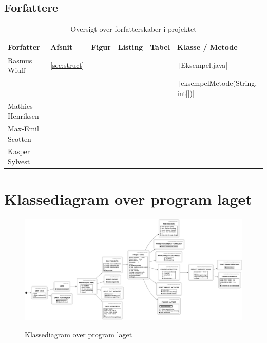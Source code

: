 \appendix
\appendixpage
\addappheadtotoc
\begin{landscape}
    \section{Forfattere}\label{apdx:forfattere}
    \begin{table}[H]
        \centering
        \caption{Oversigt over forfatterskaber i projektet}\label{tbl:forfatter}
        \begin{tabular}{llllll}
            \toprule
            Forfatter         & Afsnit            & Figur & Listing & Tabel & Klasse / Metode                                  \\
            \midrule
            Rasmus Wiuff      & \cref{sec:struct} &       &         &       & \texttt|Eksempel.java|                 \\
                              &                   &       &         &       & \texttt|eksempelMetode(String, int[])| \\
            \midrule
            Mathies Henriksen &                   &       &         &       &                                                  \\
            \midrule
            Max-Emil Scotten  &                   &       &         &       &                                                  \\
            \midrule
            Kasper Sylvest    &                   &       &         &       &                                                  \\
            \bottomrule
        \end{tabular}
    \end{table}
\end{landscape}

\section{Klassediagram over program laget}\label{apdx:classDiagram_full}
\begin{figure}[H]
    \centering
    \caption{Klassediagram over program laget}
    \includegraphics[width = \textwidth, keepaspectratio]{TaskFusion/out/assets/diagrams/flow_cli/flow_cli.png}
    \label{fig:classDiagram_full}
\end{figure}